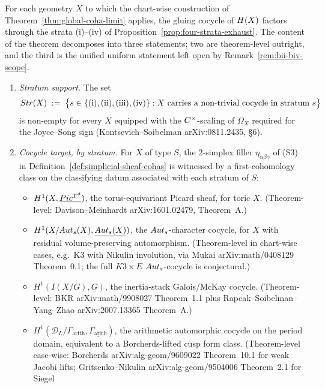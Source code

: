\begin{theorem}
\label{thm:four-stratum-structural}
\ClaimStatusProposition
For each geometry $X$ to which the chart-wise construction of
Theorem~\ref{thm:global-coha-limit} applies, the gluing cocycle of
$H(X)$ factors through the strata (i)--(iv) of
Proposition~\ref{prop:four-strata-exhaust}. The content of the
theorem decomposes into three statements; two are theorem-level
outright, and the third is the unified uniform statement left open
by Remark~\ref{rem:bii-biv-scope}.
\begin{enumerate}
\item[(A)] \emph{Stratum support.} The set
\[
  Str(X) \;:=\; \bigl\{ s \in \{(\text{i}), (\text{ii}),
    (\text{iii}), (\text{iv})\} :
    X \text{ carries a non-trivial cocycle in stratum } s \bigr\}
\]
is non-empty for every $X$ equipped with the $C^\times$-scaling
of $\Omega_X$ required for the Joyce--Song sign
(Kontsevich--Soibelman arXiv:0811.2435, \S 6).
\item[(B)] \emph{Cocycle target, by stratum.} For $X$ of type
  $S$, the 2-simplex filler $\eta_{\alpha\beta\gamma}$ of (S3) in
  Definition~\ref{def:simplicial-sheaf-cohas} is witnessed by a
  first-cohomology class on the classifying datum associated with
  each stratum of $S$:
\begin{itemize}
\item[(i)] $H^1(X, \underline{Pic^{T^d}})$, the torus-equivariant
  Picard sheaf, for toric $X$. (Theorem-level: Davison--Meinhardt
  arXiv:1601.02479, Theorem~A.)
\item[(ii)] $H^1(X / Aut_s(X), \underline{Aut_s(X)})$, the
  $Aut_s$-character cocycle, for $X$ with residual
  volume-preserving automorphism. (Theorem-level in chart-wise
  cases, e.g.\ K3 with Nikulin involution, via Mukai
  arXiv:math/0408129 Theorem~0.1; the full $K3 \times E$
  $Aut_s$-cocycle is conjectural.)
\item[(iii)] $H^1(I(X/G), \underline{G})$, the inertia-stack
  Galois/McKay cocycle. (Theorem-level: BKR arXiv:math/9908027
  Theorem~1.1 plus Rapcak--Soibelman--Yang--Zhao arXiv:2007.13365
  Theorem~A.)
\item[(iv)] $H^1(\mathcal{D}_L / \Gamma_{\mathrm{arith}},
  \underline{\Gamma_{\mathrm{arith}}})$, the arithmetic automorphic
  cocycle on the period domain, equivalent to a Borcherds-lifted
  cusp form class. (Theorem-level case-wise: Borcherds
  arXiv:alg-geom/9609022 Theorem~10.1 for weak Jacobi lifts;
  Gritsenko--Nikulin arXiv:alg-geom/9504006 Theorem~2.1 for Siegel

\end{itemize}
\end{enumerate}
\end{theorem}
